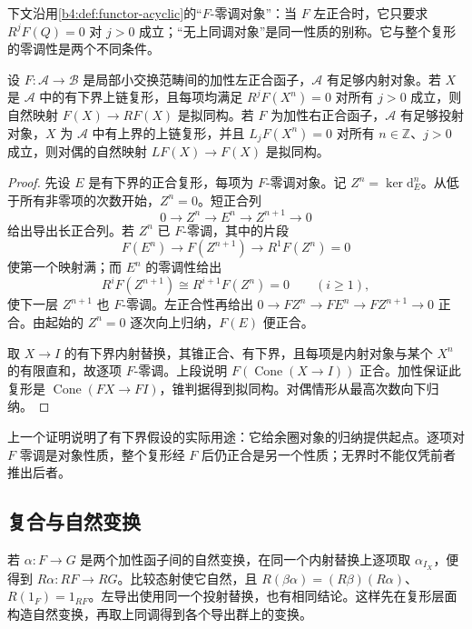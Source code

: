 下文沿用\cref{b4:def:functor-acyclic}的“\(F\)-零调对象”：当 \(F\) 左正合时，它只要求 \(R^jF(Q)=0\) 对 \(j>0\) 成立；“无上同调对象”是同一性质的别称。它与整个复形的零调性是两个不同条件。

\begin{proposition}\label{b4:prop:total-derived-acyclic-complex}
	设 \(F:\mathcal A\to\mathcal B\) 是局部小交换范畴间的加性左正合函子，\(\mathcal A\) 有足够内射对象。若 \(X\) 是 \(\mathcal A\) 中的有下界上链复形，且每项均满足 \(R^jF(X^n)=0\) 对所有 \(j>0\) 成立，则自然映射 \(F(X)\to RF(X)\) 是拟同构。若 \(F\) 为加性右正合函子，\(\mathcal A\) 有足够投射对象，\(X\) 为 \(\mathcal A\) 中有上界的上链复形，并且 \(L_jF(X^n)=0\) 对所有 \(n\in\mathbb Z\)、\(j>0\) 成立，则对偶的自然映射 \(LF(X)\to F(X)\) 是拟同构。
\end{proposition}
\begin{proof}
	先设 \(E\) 是有下界的正合复形，每项为 \(F\)-零调对象。记 \(Z^n=\ker \mathrm{d}_E^n\)。从低于所有非零项的次数开始，\(Z^n=0\)。短正合列
	\[
		0\longrightarrow Z^n\longrightarrow E^n\longrightarrow Z^{n+1}\longrightarrow0
	\]
	给出导出长正合列。若 \(Z^n\) 已 \(F\)-零调，其中的片段
	\[
		F(E^n)\longrightarrow F(Z^{n+1})\longrightarrow R^1F(Z^n)=0
	\]
	使第一个映射满；而 \(E^n\) 的零调性给出
	\[
		R^iF(Z^{n+1})\cong R^{i+1}F(Z^n)=0\qquad(i\ge1),
	\]
	使下一层 \(Z^{n+1}\) 也 \(F\)-零调。左正合性再给出 \(0\to FZ^n\to FE^n\to FZ^{n+1}\to0\) 正合。由起始的 \(Z^n=0\) 逐次向上归纳，\(F(E)\) 便正合。

	取 \(X\to I\) 的有下界内射替换，其锥正合、有下界，且每项是内射对象与某个 \(X^n\) 的有限直和，故逐项 \(F\)-零调。上段说明 \(F(\operatorname{Cone}(X\to I))\) 正合。加性保证此复形是 \(\operatorname{Cone}(FX\to FI)\)，锥判据得到拟同构。对偶情形从最高次数向下归纳。
\end{proof}

上一个证明说明了有下界假设的实际用途：它给余圈对象的归纳提供起点。逐项对 \(F\) 零调是对象性质，整个复形经 \(F\) 后仍正合是另一个性质；无界时不能仅凭前者推出后者。

\subsection{复合与自然变换}
\label{b4:subsec:1801:03}

若 \(\alpha:F\to G\) 是两个加性函子间的自然变换，在同一个内射替换上逐项取 \(\alpha_{I_X}\)，便得到 \(R\alpha:RF\to RG\)。比较态射使它自然，且 \(R(\beta\alpha)=(R\beta)(R\alpha)\)、\(R(1_F)=1_{RF}\)。左导出使用同一个投射替换，也有相同结论。这样先在复形层面构造自然变换，再取上同调得到各个导出群上的变换。

